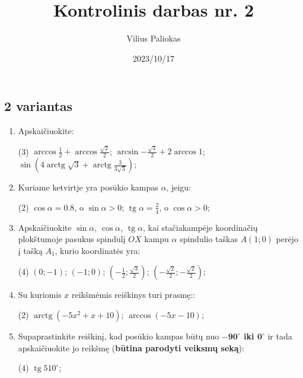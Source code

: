\documentclass[a4paper]{article}
\title{Kontrolinis darbas nr. 2}
\author{Vilius Paliokas}
\date{2023/10/17}
\DeclareMathOperator{\tg}{tg}
\DeclareMathOperator{\arctg}{arctg}
\begin{document}
\thispagestyle{empty}
\subsection*{2 variantas}

\begin{enumerate}
      \item Apskaičiuokite:

            \begin{tasks}[item-format={\normalfont}, after-item-skip=4mm](3)
                  \task $\arccos{\frac{1}{2}} + \arccos{\frac{\sqrt{2}}{2}} $;
                  \task $\arcsin{-\frac{\sqrt{3}}{2}} + 2\arccos{1} $;
                  \task $\sin({4\arctg{\sqrt{3}} +
                              \arctg{\frac{3}{3\sqrt{3}}}})  $;

            \end{tasks}

      \item Kuriame ketvirtje yra posūkio kampas $\alpha$, jeigu:
            \begin{tasks}[item-format={\normalfont}, after-item-skip=4mm](2)
                  \task $\cos \alpha = 0.8$, o $\sin \alpha > 0$;
                  \task $\tg \alpha = \frac{2}{4}$, o $\cos \alpha > 0$;
            \end{tasks}
      \item Apskaičiuokite $\sin \alpha$, $\cos \alpha$, $\tg \alpha$, kai
            stačiakampėje koordinačių plokštumoje pasukus spindulį $OX$ kampu
            $\alpha$ spindulio taškas $A(1; 0)$ perėjo į tašką $A_{1}$, kurio
            koordinatės
            yra:
            \begin{tasks}[item-format={\normalfont}, after-item-skip=4mm](4)
                  \task $(0; -1)$;
                  \task $(-1; 0)$;
                  \task $(-\frac{1}{2}; \frac{\sqrt{3}}{2})$;
                  \task $(-\frac{\sqrt{2}}{2}; -\frac{\sqrt{2}}{2})$;
            \end{tasks}

      \item Su kuriomis $x$ reikšmėmis reiškinys turi prasmę::
            \begin{tasks}[item-format={\normalfont},
                        after-item-skip=4mm](2)
                  \task $\arctg(-5x^2+x+10)$;
                  \task $\arccos(-5x-10)$;
            \end{tasks}

      \item Supaprastinkite reiškinį, kad posūkio kampas būtų nuo
            \textbf{$\boldsymbol{-90^\circ}$
                  iki  $\boldsymbol{0^\circ}$} ir tada apskaičiuokite jo
            reikšmę
            (\textbf{būtina parodyti veiksmų seką}):
            \begin{tasks}[item-format={\normalfont},
                        after-item-skip=4mm](4)
                  \task $\tg 510^\circ$;


\end{tasks}
\end{enumerate}
\end{document}

